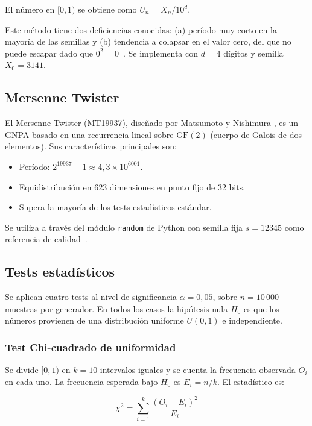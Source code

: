 \documentclass[a4paper, 11pt]{article}
\begin{document}
El número en $[0, 1)$ se obtiene como $U_n = X_n / 10^d$.

Este método tiene dos deficiencias conocidas: (a) período muy corto en la
mayoría de las semillas y (b) tendencia a colapsar en el valor cero, del que
no puede escapar dado que $0^2 = 0$~\cite{knuth1997art}. Se implementa con
$d = 4$ dígitos y semilla $X_0 = 3141$.

\subsection{Mersenne Twister}

El Mersenne Twister (MT19937), diseñado por Matsumoto y Nishimura
\cite{matsumoto1998mersenne}, es un GNPA basado en una recurrencia lineal
sobre $\text{GF}(2)$ (cuerpo de Galois de dos elementos). Sus características
principales son:

\begin{itemize}
  \item Período: $2^{19937} - 1 \approx 4{,}3 \times 10^{6001}$.
  \item Equidistribución en 623 dimensiones en punto fijo de 32 bits.
  \item Supera la mayoría de los tests estadísticos estándar.
\end{itemize}

Se utiliza a través del módulo \texttt{random} de Python con semilla fija
$s = 12345$ como referencia de calidad~\cite{python_random}.

\subsection{Tests estadísticos}

Se aplican cuatro tests al nivel de significancia $\alpha = 0{,}05$, sobre
$n = 10\,000$ muestras por generador. En todos los casos la hipótesis nula
$H_0$ es que los números provienen de una distribución uniforme $U(0,1)$
e independiente.

\subsubsection{Test Chi-cuadrado de uniformidad}

Se divide $[0, 1)$ en $k = 10$ intervalos iguales y se cuenta la frecuencia
observada $O_i$ en cada uno. La frecuencia esperada bajo $H_0$ es $E_i = n/k$.
El estadístico es:

\begin{equation}
  \chi^2 = \sum_{i=1}^{k} \frac{(O_i - E_i)^2}{E_i}
  \label{eq:chi2}
\end{equation}
\end{document}
